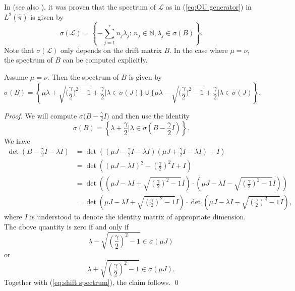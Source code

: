 In \cite{Metafune_formula} (see also \cite{OPP12}), it was proven that
the spectrum of $\mathcal{L}$ as in (\ref{eq:OU generator}) in $L^{2}(\widehat{\pi})$
is given by 
\begin{equation}
\sigma(\mathcal{L})=\left\{-\sum_{j=1}^{r}n_{j}\lambda_{j}:\, n_{j}\in\mathbb{N},\lambda_{j}\in \sigma(B)\right\}.\label{eq:Metafune formula}
\end{equation}
Note that $\sigma(\mathcal{L})$ only depends on the drift matrix
$B$. In the case where $\mu=\nu$,
the spectrum of $B$ can be computed explicitly. 
\begin{lemma}
	\label{lem:drift matrix properties}Assume $\mu=\nu$. Then the spectrum
	of $B$ is given by
	\begin{equation}
	\sigma(B)=\left\{\mu\lambda+\sqrt{\big(\frac{\gamma}{2}\big)^{2}-1}+\frac{\gamma}{2}\vert\lambda\in\sigma(J)\}\cup\{\mu\lambda-\sqrt{\big(\frac{\gamma}{2}\big)^{2}-1}+\frac{\gamma}{2}\vert\lambda\in\sigma(J)\right\}.\label{eq:spectrum of B}
	\end{equation}
\end{lemma}
\begin{proof}
	We will compute $\sigma\big(B-\frac{\gamma}{2}I\big)$ and then use
	the identity
	\begin{equation}
	\sigma(B)=\left\{\lambda+\frac{\gamma}{2}\vert\lambda\in\sigma\left(B-\frac{\gamma}{2}I\right)\right\}.\label{eq:shift spectrum}
	\end{equation}
	We have 
	\begin{align*}
	\det\left(B-\frac{\gamma}{2}I-\lambda I\right) & =\det\left(\left(\mu J-\frac{\gamma}{2}I-\lambda I\right)\left(\mu J+\frac{\gamma}{2}I-\lambda I\right)+I\right)\\
	& =\det\left((\mu J-\lambda I)^{2}-\left(\frac{\gamma}{2}\right)^{2}I+I\right)\\
	& =\det\left(\left(\mu J-\lambda I+\sqrt{\left(\frac{\gamma}{2}\right)^{2}-1} I\right)\cdot\left(\mu J-\lambda I-\sqrt{\left(\frac{\gamma}{2} \right)^{2}-1} I\right)\right)\\
	& =\det\left(\mu J-\lambda I+\sqrt{\left(\frac{\gamma}{2}\right)^{2}-1} I\right)\cdot\det\left(\mu J-\lambda I-\sqrt{\left(\frac{\gamma}{2}\right)^{2}-1} I\right),
	\end{align*}
	where $I$ is understood to denote the identity matrix of appropriate dimension.
	The above quantity is zero if and only if 
	\[
	\lambda-\sqrt{\left(\frac{\gamma}{2}\right)^{2}-1}\in\sigma(\mu J)
	\]
	or 
	\[
	\lambda+\sqrt{\left(\frac{\gamma}{2}\right)^{2}-1}\in\sigma(\mu J).
	\]
	Together with (\ref{eq:shift spectrum}), the claim follows.
	\qed
\end{proof}
